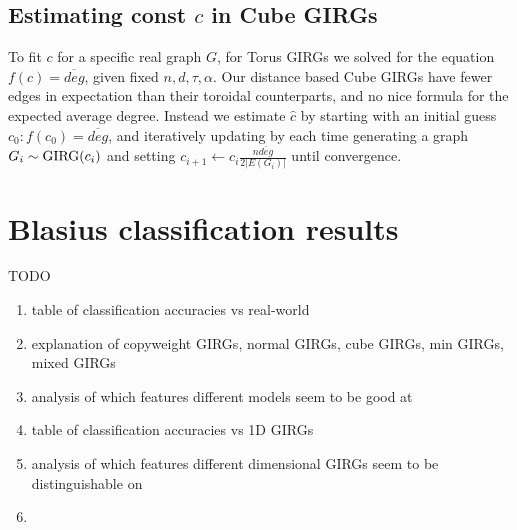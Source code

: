 \subsection{Estimating const $c$ in Cube GIRGs}
To fit $c$ for a specific real graph $G$, for Torus GIRGs we solved for the equation $f(c) = \overline{deg}$, given fixed $n, d, \tau, \alpha$. Our distance based Cube GIRGs have fewer edges in expectation than their toroidal counterparts, and no nice formula for the expected average degree. Instead we estimate $\hat{c}$ by starting with an initial guess $c_0: f(c_0) = \overline{deg}$, and iteratively updating by each time generating a graph $G_i \sim \operatorname{GIRG}(c_i)$ and setting $c_{i+1} \gets c_i \frac{n \overline{deg}}{2 |E(G_i)|}$ until convergence.

\section{Blasius classification results}
TODO
\begin{enumerate}
    \item table of classification accuracies vs real-world
    \item explanation of copyweight GIRGs, normal GIRGs, cube GIRGs, min GIRGs, mixed GIRGs
    \item analysis of which features different models seem to be good at
    \item table of classification accuracies vs 1D GIRGs
    \item analysis of which features different dimensional GIRGs seem to be distinguishable on
    \item 
\end{enumerate}


